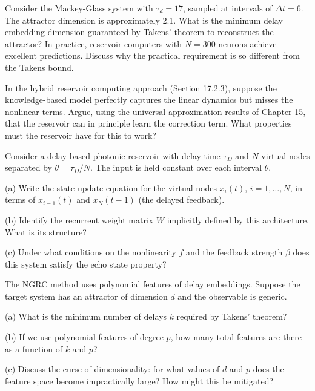 \begin{exercise}
Consider the Mackey-Glass system with $\tau_d = 17$, sampled at intervals of $\Delta t = 6$. The attractor dimension is approximately 2.1. What is the minimum delay embedding dimension guaranteed by Takens' theorem to reconstruct the attractor? In practice, reservoir computers with $N = 300$ neurons achieve excellent predictions. Discuss why the practical requirement is so different from the Takens bound.
\end{exercise}


\begin{exercise}
In the hybrid reservoir computing approach (Section 17.2.3), suppose the knowledge-based model perfectly captures the linear dynamics but misses the nonlinear terms. Argue, using the universal approximation results of Chapter 15, that the reservoir can in principle learn the correction term. What properties must the reservoir have for this to work?
\end{exercise}


\begin{exercise}
Consider a delay-based photonic reservoir with delay time $\tau_D$ and $N$ virtual nodes separated by $\theta = \tau_D / N$. The input is held constant over each interval $\theta$.

(a) Write the state update equation for the virtual nodes $x_i(t)$, $i = 1, \ldots, N$, in terms of $x_{i-1}(t)$ and $x_N(t-1)$ (the delayed feedback).

(b) Identify the recurrent weight matrix $W$ implicitly defined by this architecture. What is its structure?

(c) Under what conditions on the nonlinearity $f$ and the feedback strength $\beta$ does this system satisfy the echo state property?
\end{exercise}


\begin{exercise}
The NGRC method uses polynomial features of delay embeddings. Suppose the target system has an attractor of dimension $d$ and the observable is generic.

(a) What is the minimum number of delays $k$ required by Takens' theorem?

(b) If we use polynomial features of degree $p$, how many total features are there as a function of $k$ and $p$?

(c) Discuss the curse of dimensionality: for what values of $d$ and $p$ does the feature space become impractically large? How might this be mitigated?
\end{exercise}


